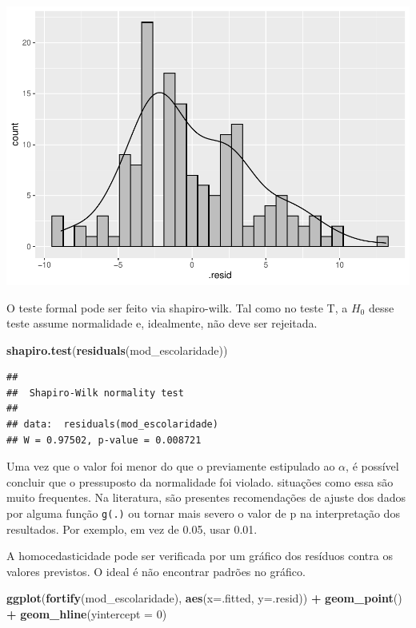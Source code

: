 \documentclass[
]{book}
\newenvironment{Shaded}{\begin{snugshade}}{\end{snugshade}}
\newcommand{\DataTypeTok}[1]{\textcolor[rgb]{0.13,0.29,0.53}{#1}}
\newcommand{\DecValTok}[1]{\textcolor[rgb]{0.00,0.00,0.81}{#1}}
\newcommand{\KeywordTok}[1]{\textcolor[rgb]{0.13,0.29,0.53}{\textbf{#1}}}
\newcommand{\NormalTok}[1]{#1}
\newcommand{\OperatorTok}[1]{\textcolor[rgb]{0.81,0.36,0.00}{\textbf{#1}}}
\newcommand{\StringTok}[1]{\textcolor[rgb]{0.31,0.60,0.02}{#1}}
\begin{document}
\begin{center}\includegraphics{gitbook-demo_files/figure-latex/unnamed-chunk-54-1} \end{center}

O teste formal pode ser feito via shapiro-wilk. Tal como no teste T, a \(H_0\) desse teste assume normalidade e, idealmente, não deve ser rejeitada.

\begin{Shaded}
\begin{Highlighting}[]
\KeywordTok{shapiro.test}\NormalTok{(}\KeywordTok{residuals}\NormalTok{(mod_escolaridade))}
\end{Highlighting}
\end{Shaded}

\begin{verbatim}
## 
##  Shapiro-Wilk normality test
## 
## data:  residuals(mod_escolaridade)
## W = 0.97502, p-value = 0.008721
\end{verbatim}

Uma vez que o valor foi menor do que o previamente estipulado ao \(\alpha\), é possível concluir que o pressuposto da normalidade foi violado. situações como essa são muito frequentes. Na literatura, são presentes recomendações de ajuste dos dados por alguma função \texttt{g(.)} ou tornar mais severo o valor de p na interpretação dos resultados. Por exemplo, em vez de 0.05, usar 0.01.

A homocedasticidade pode ser verificada por um gráfico dos resíduos contra os valores previstos. O ideal é não encontrar padrões no gráfico.

\begin{Shaded}
\begin{Highlighting}[]
\KeywordTok{ggplot}\NormalTok{(}\KeywordTok{fortify}\NormalTok{(mod_escolaridade), }\KeywordTok{aes}\NormalTok{(}\DataTypeTok{x=}\NormalTok{.fitted, }\DataTypeTok{y=}\NormalTok{.resid)) }\OperatorTok{+}\StringTok{ }
\StringTok{  }\KeywordTok{geom_point}\NormalTok{() }\OperatorTok{+}
\StringTok{  }\KeywordTok{geom_hline}\NormalTok{(}\DataTypeTok{yintercept =} \DecValTok{0}\NormalTok{)}
\end{Highlighting}
\end{Shaded}
\end{document}
